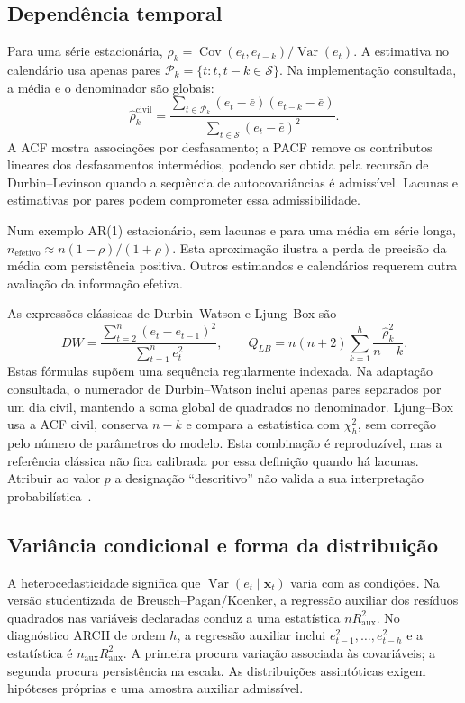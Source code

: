 \subsection{Dependência temporal}
\label{sec:mat-acf}
Para uma série estacionária, $\rho_k=\operatorname{Cov}(e_t,e_{t-k})/\operatorname{Var}(e_t)$. A estimativa no calendário usa apenas pares $\mathcal P_k=\{t:t,t-k\in\mathcal S\}$. Na implementação consultada, a média e o denominador são globais:
\begin{equation}
\widehat\rho_k^{\mathrm{civil}}=
\frac{\sum_{t\in\mathcal P_k}(e_t-\bar e)(e_{t-k}-\bar e)}
{\sum_{t\in\mathcal S}(e_t-\bar e)^2}.
\label{eq:mat-acf-civil}
\end{equation}
A ACF mostra associações por desfasamento; a PACF remove os contributos lineares dos desfasamentos intermédios, podendo ser obtida pela recursão de Durbin--Levinson quando a sequência de autocovariâncias é admissível. Lacunas e estimativas por pares podem comprometer essa admissibilidade.

Num exemplo AR(1) estacionário, sem lacunas e para uma média em série longa, $n_{\mathrm{efetivo}}\approx n(1-\rho)/(1+\rho)$. Esta aproximação ilustra a perda de precisão da média com persistência positiva. Outros estimandos e calendários requerem outra avaliação da informação efetiva.

As expressões clássicas de Durbin--Watson e Ljung--Box são
\begin{equation}
DW=\frac{\sum_{t=2}^{n}(e_t-e_{t-1})^2}{\sum_{t=1}^{n}e_t^2},
\qquad Q_{LB}=n(n+2)\sum_{k=1}^{h}\frac{\widehat\rho_k^2}{n-k}.
\label{eq:mat-dw-lb}
\end{equation}
Estas fórmulas supõem uma sequência regularmente indexada. Na adaptação consultada, o numerador de Durbin--Watson inclui apenas pares separados por um dia civil, mantendo a soma global de quadrados no denominador. Ljung--Box usa a ACF civil, conserva $n-k$ e compara a estatística com $\chi^2_h$, sem correção pelo número de parâmetros do modelo. Esta combinação é reproduzível, mas a referência clássica não fica calibrada por essa definição quando há lacunas. Atribuir ao valor $p$ a designação ``descritivo'' não valida a sua interpretação probabilística~\parencite{BoxJenkins2015}.

\subsection{Variância condicional e forma da distribuição}
\label{sec:mat-variancia-forma}
A heterocedasticidade significa que $\operatorname{Var}(e_t\mid\boldsymbol x_t)$ varia com as condições. Na versão studentizada de Breusch--Pagan/Koenker, a regressão auxiliar dos resíduos quadrados nas variáveis declaradas conduz a uma estatística $nR_{\mathrm{aux}}^2$. No diagnóstico ARCH de ordem $h$, a regressão auxiliar inclui $e_{t-1}^2,\ldots,e_{t-h}^2$ e a estatística é $n_{\mathrm{aux}}R_{\mathrm{aux}}^2$. A primeira procura variação associada às covariáveis; a segunda procura persistência na escala. As distribuições assintóticas exigem hipóteses próprias e uma amostra auxiliar admissível.


